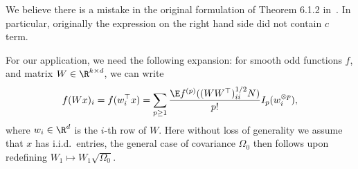 \begin{remark}
    We believe there is a mistake in the original formulation of Theorem 6.1.2 in~\cite{nourdin2012normal}.
    In particular, originally the expression on the right hand side did not contain \(c\) term.
\end{remark}
For our application, we need the following expansion: for smooth odd functions \(f\), and matrix \(W \in \R^{k \times d}\), we can write
\begin{equation}
\label{eq:wiener_chaos_expansion}
\begin{aligned}
    f(Wx)_i = f(w_i^{\top} x) = \sum_{p \geq 1} \frac{\E f^{(p)} ((W W^{\top})^{1/2}_{ii} N)}{p!} I_p(w_i^{\otimes p}), 
\end{aligned}
\end{equation}
where \(w_i \in \R^d\) is the \(i\)-th row of \(W\). Here without loss of generality we assume that $x$ has i.i.d.\ entries, the general case of covariance $\Omega_0$ then follows upon redefining $W_1\mapsto W_1\sqrt{\Omega_0}$. 
